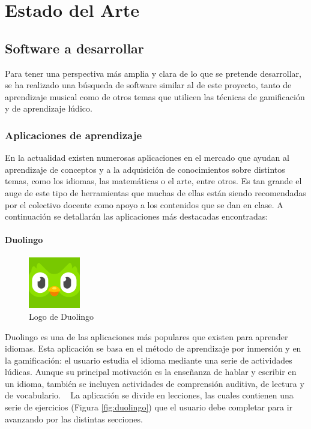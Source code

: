 \chapter{Estado del Arte}
\section{Software a desarrollar}
Para tener una perspectiva más amplia y clara de lo que se pretende desarrollar, se ha realizado una búsqueda de software similar al de este proyecto,
tanto de aprendizaje musical como de otros temas que utilicen las técnicas de gamificación y de aprendizaje lúdico.

\subsection{Aplicaciones de aprendizaje}
En la actualidad existen numerosas aplicaciones en el mercado que ayudan al aprendizaje de conceptos y a la adquisición de conocimientos sobre distintos temas, 
como los idiomas, las matemáticas o el arte, entre otros. Es tan grande el auge de este tipo de herramientas que muchas de ellas están siendo
recomendadas por el colectivo docente como apoyo a los contenidos que se dan en clase. A continuación se
detallarán las aplicaciones más destacadas encontradas:

\subsubsection{Duolingo}
\begin{figure}
    \vspace*{-0.4cm}
    \centering
    \includegraphics[width=0.2\textwidth]{imagenes/c2/duolingo.png}
    \caption{Logo de Duolingo}
    \vspace*{-0.15cm}
\end{figure}

Duolingo es una de las aplicaciones más populares que existen para aprender idiomas. Esta aplicación se basa en el método
de aprendizaje por inmersión y en la gamificación: el usuario estudia el idioma mediante una serie de actividades lúdicas.
Aunque su principal motivación es la enseñanza de hablar y escribir en un idioma, también se incluyen actividades de
comprensión auditiva, de lectura y de vocabulario. ~\cite{duolingo}
\newpage
La aplicación se divide en lecciones, las cuales contienen una serie de ejercicios (Figura \ref{fig:duolingo}) que el usuario debe
completar para ir avanzando por las distintas secciones.


